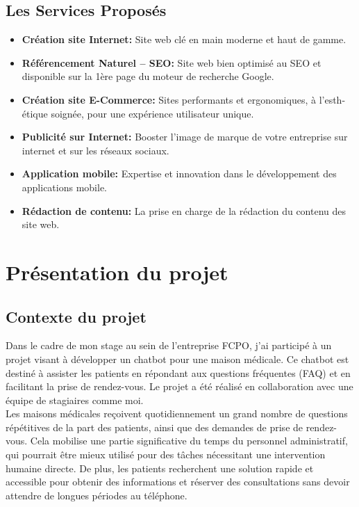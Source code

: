 \subsection{Les Services Proposés}

\begin{itemize}
  \item \textbf{Création site Internet: }Site web clé en main moderne et haut de gamme.
  \item \textbf{Référencement Naturel – SEO: }Site web bien optimisé au SEO et disponible sur la 1ère page du moteur de recherche Google.
  \item \textbf{Création site E-Commerce: }Sites performants et ergonomiques, à l'esth-étique soignée, pour une expérience utilisateur unique.
  \item \textbf{Publicité sur Internet: }Booster l'image de marque de votre entreprise sur internet et sur les réseaux sociaux.
  \item \textbf{Application mobile: }Expertise et innovation dans le développement des applications mobile.
  \item \textbf{Rédaction de contenu: }La prise en charge de la rédaction du contenu des site web.

\end{itemize}






\section{Présentation du projet}


\subsection{Contexte du projet}

\hspace{16pt}Dans le cadre de mon stage au sein de l'entreprise FCPO, j'ai participé à un projet visant à développer un chatbot pour une maison médicale. Ce chatbot est destiné à assister les patients en répondant aux questions fréquentes (FAQ) et en facilitant la prise de rendez-vous. Le projet a été réalisé en collaboration avec une équipe de stagiaires comme moi.\\

Les maisons médicales reçoivent quotidiennement un grand nombre de questions répétitives de la part des patients, ainsi que des demandes de prise de rendez-vous. Cela mobilise une partie significative du temps du personnel administratif, qui pourrait être mieux utilisé pour des tâches nécessitant une intervention humaine directe. De plus, les patients recherchent une solution rapide et accessible pour obtenir des informations et réserver des consultations sans devoir attendre de longues périodes au téléphone.\\

